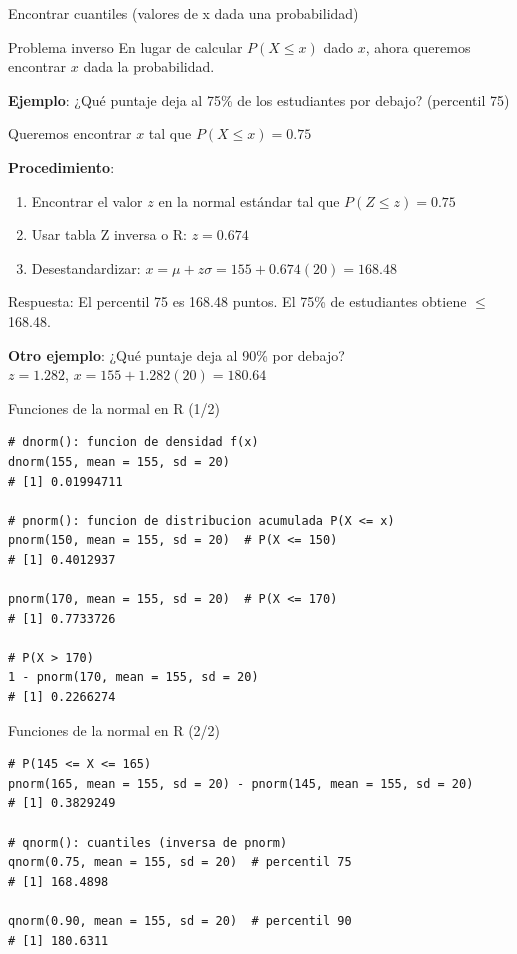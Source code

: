 \documentclass[aspectratio=169, 11pt]{beamer}
\begin{document}
\begin{frame}{Encontrar cuantiles (valores de x dada una probabilidad)}
\begin{block}{Problema inverso}
En lugar de calcular $P(X \leq x)$ dado $x$, ahora queremos encontrar $x$ dada la probabilidad.
\end{block}

\textbf{Ejemplo}: ¿Qué puntaje deja al 75\% de los estudiantes por debajo? (percentil 75)

Queremos encontrar $x$ tal que $P(X \leq x) = 0.75$

\vspace{0.5em}
\textbf{Procedimiento}:
\begin{enumerate}
\item Encontrar el valor $z$ en la normal estándar tal que $P(Z \leq z) = 0.75$
\item Usar tabla Z inversa o R: $z = 0.674$
\item Desestandardizar: $x = \mu + z\sigma = 155 + 0.674(20) = 168.48$
\end{enumerate}

\alert{Respuesta}: El percentil 75 es 168.48 puntos. El 75\% de estudiantes obtiene $\leq$ 168.48.

\vspace{0.5em}
\textbf{Otro ejemplo}: ¿Qué puntaje deja al 90\% por debajo?\\
$z = 1.282$, $x = 155 + 1.282(20) = 180.64$
\end{frame}

\begin{frame}[fragile]{Funciones de la normal en R (1/2)}
\begin{lstlisting}
# dnorm(): funcion de densidad f(x)
dnorm(155, mean = 155, sd = 20)
# [1] 0.01994711

# pnorm(): funcion de distribucion acumulada P(X <= x)
pnorm(150, mean = 155, sd = 20)  # P(X <= 150)
# [1] 0.4012937

pnorm(170, mean = 155, sd = 20)  # P(X <= 170)
# [1] 0.7733726

# P(X > 170)
1 - pnorm(170, mean = 155, sd = 20)
# [1] 0.2266274
\end{lstlisting}
\end{frame}

\begin{frame}[fragile]{Funciones de la normal en R (2/2)}
\begin{lstlisting}
# P(145 <= X <= 165)
pnorm(165, mean = 155, sd = 20) - pnorm(145, mean = 155, sd = 20)
# [1] 0.3829249

# qnorm(): cuantiles (inversa de pnorm)
qnorm(0.75, mean = 155, sd = 20)  # percentil 75
# [1] 168.4898

qnorm(0.90, mean = 155, sd = 20)  # percentil 90
# [1] 180.6311
\end{lstlisting}
\end{frame}
\end{document}
